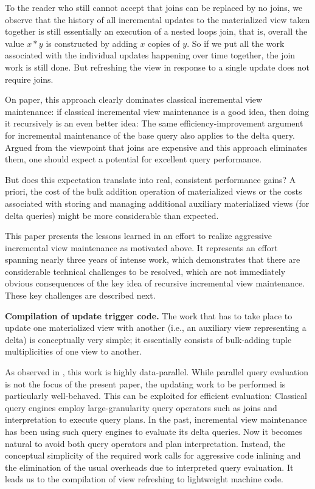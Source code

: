 To the reader who still cannot accept that joins can be replaced by no joins, we observe that the history of all incremental updates to the materialized view taken together is still essentially an execution of a nested loops join, that is, overall the value $x*y$ is constructed by adding $x$ copies of $y$. So if we put all the work associated with the individual updates happening over time together, the join work is still done. But refreshing the view in response to a single update does not require joins.


On paper, this approach clearly dominates classical incremental view maintenance: if classical incremental view maintenance is a good idea, then doing it recursively is an even better idea: The same efficiency-improvement argument for incremental maintenance of the base query also applies to the delta query. Argued from the viewpoint that joins are expensive and this approach eliminates them, one should expect a potential for excellent query performance.

But does this expectation translate into real, consistent performance gains? A priori, the cost of the bulk addition operation of materialized views or the costs associated with storing and managing additional auxiliary materialized views (for delta queries) might be more considerable than expected.


\medskip


This paper presents the lessons learned in an effort to realize aggressive incremental view maintenance as motivated above. It represents an effort spanning nearly three years of intense work, which demonstrates that there are considerable technical challenges to be resolved, which are not immediately obvious consequences of the key idea of recursive incremental view maintenance. These key challenges are described next.

{\bf Compilation of update trigger code.}
%
The work that has to take place to update one materialized view with another (i.e., an auxiliary view representing a delta) is conceptually very simple; it essentially consists of bulk-adding tuple multiplicities of one view to another.

As observed in \cite{koch-pods:10}, this work is highly data-parallel. While parallel query evaluation is not the focus of the present paper, the updating work to be performed is particularly well-behaved. This can be exploited for efficient evaluation:
Classical query engines employ large-granularity query operators such as joins and interpretation to execute query plans. In the past, incremental view maintenance has been using such query engines to evaluate its delta queries.
Now it becomes natural to avoid both query operators and plan interpretation.
Instead, the conceptual simplicity of the required work calls for aggressive code inlining and the elimination of the usual overheads due to interpreted query evaluation. It leads us to the compilation of view refreshing to lightweight machine code.

